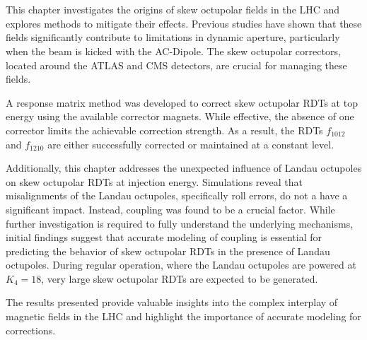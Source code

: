 

\FloatBarrier
\section{}


This chapter investigates the origins of skew octupolar fields in the LHC and explores methods to
mitigate their effects. Previous studies have shown that these fields significantly contribute to
limitations in dynamic aperture, particularly when the beam is kicked with the AC-Dipole. The skew
octupolar correctors, located around the ATLAS and CMS detectors, are crucial for managing these
fields.

A response matrix method was developed to correct skew octupolar RDTs at top energy using the
available corrector magnets. While effective, the absence of one corrector limits the achievable
correction strength. As a result, the RDTs $f_{1012}$ and $f_{1210}$ are either successfully
corrected or maintained at a constant level.

Additionally, this chapter addresses the unexpected influence of Landau octupoles on skew octupolar
RDTs at injection energy. Simulations reveal that misalignments of the Landau octupoles,
specifically roll errors, do not a have a significant impact. Instead, coupling was found to be a
crucial factor.  While further investigation is required to fully understand the underlying
mechanisms, initial findings suggest that accurate modeling of coupling is essential for predicting
the behavior of skew octupolar RDTs in the presence of Landau octupoles. During regular operation,
where the Landau octupoles are powered at $K_4=18$, very large skew octupolar RDTs are expected to
be generated.

The results presented provide valuable insights into the complex interplay of
magnetic fields in the LHC and highlight the importance of accurate modeling for corrections.